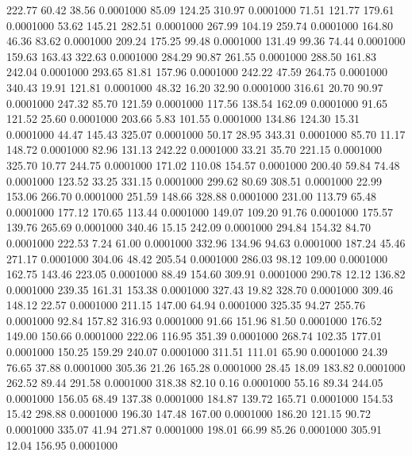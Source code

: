  222.77   60.42   38.56   0.0001000
  85.09  124.25  310.97   0.0001000
  71.51  121.77  179.61   0.0001000
  53.62  145.21  282.51   0.0001000
 267.99  104.19  259.74   0.0001000
 164.80   46.36   83.62   0.0001000
 209.24  175.25   99.48   0.0001000
 131.49   99.36   74.44   0.0001000
 159.63  163.43  322.63   0.0001000
 284.29   90.87  261.55   0.0001000
 288.50  161.83  242.04   0.0001000
 293.65   81.81  157.96   0.0001000
 242.22   47.59  264.75   0.0001000
 340.43   19.91  121.81   0.0001000
  48.32   16.20   32.90   0.0001000
 316.61   20.70   90.97   0.0001000
 247.32   85.70  121.59   0.0001000
 117.56  138.54  162.09   0.0001000
  91.65  121.52   25.60   0.0001000
 203.66    5.83  101.55   0.0001000
 134.86  124.30   15.31   0.0001000
  44.47  145.43  325.07   0.0001000
  50.17   28.95  343.31   0.0001000
  85.70   11.17  148.72   0.0001000
  82.96  131.13  242.22   0.0001000
  33.21   35.70  221.15   0.0001000
 325.70   10.77  244.75   0.0001000
 171.02  110.08  154.57   0.0001000
 200.40   59.84   74.48   0.0001000
 123.52   33.25  331.15   0.0001000
 299.62   80.69  308.51   0.0001000
  22.99  153.06  266.70   0.0001000
 251.59  148.66  328.88   0.0001000
 231.00  113.79   65.48   0.0001000
 177.12  170.65  113.44   0.0001000
 149.07  109.20   91.76   0.0001000
 175.57  139.76  265.69   0.0001000
 340.46   15.15  242.09   0.0001000
 294.84  154.32   84.70   0.0001000
 222.53    7.24   61.00   0.0001000
 332.96  134.96   94.63   0.0001000
 187.24   45.46  271.17   0.0001000
 304.06   48.42  205.54   0.0001000
 286.03   98.12  109.00   0.0001000
 162.75  143.46  223.05   0.0001000
  88.49  154.60  309.91   0.0001000
 290.78   12.12  136.82   0.0001000
 239.35  161.31  153.38   0.0001000
 327.43   19.82  328.70   0.0001000
 309.46  148.12   22.57   0.0001000
 211.15  147.00   64.94   0.0001000
 325.35   94.27  255.76   0.0001000
  92.84  157.82  316.93   0.0001000
  91.66  151.96   81.50   0.0001000
 176.52  149.00  150.66   0.0001000
 222.06  116.95  351.39   0.0001000
 268.74  102.35  177.01   0.0001000
 150.25  159.29  240.07   0.0001000
 311.51  111.01   65.90   0.0001000
  24.39   76.65   37.88   0.0001000
 305.36   21.26  165.28   0.0001000
  28.45   18.09  183.82   0.0001000
 262.52   89.44  291.58   0.0001000
 318.38   82.10    0.16   0.0001000
  55.16   89.34  244.05   0.0001000
 156.05   68.49  137.38   0.0001000
 184.87  139.72  165.71   0.0001000
 154.53   15.42  298.88   0.0001000
 196.30  147.48  167.00   0.0001000
 186.20  121.15   90.72   0.0001000
 335.07   41.94  271.87   0.0001000
 198.01   66.99   85.26   0.0001000
 305.91   12.04  156.95   0.0001000
